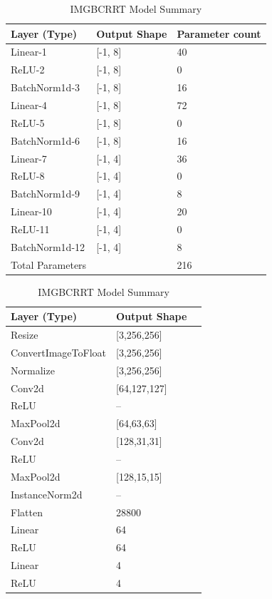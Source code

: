 \documentclass{article}
\begin{document}
\begin{table}[h]
\parbox{.45\linewidth}{
  \caption{BCRRT Model Summary}
  \label{bcrrt model summary}
  \centering
  \begin{tabular}{lll}
    \cmidrule(r){1-3}
   Layer (Type)          & Output Shape       &Parameter count\\
    \midrule
    Linear-1 & [-1, 8] & 40\\
    ReLU-2 & [-1, 8] & 0\\
    BatchNorm1d-3 & [-1, 8] & 16\\
    Linear-4 & [-1, 8] & 72\\
    ReLU-5 & [-1, 8] & 0\\
    BatchNorm1d-6 & [-1, 8] & 16\\
    Linear-7 & [-1, 4] & 36\\
    ReLU-8 & [-1, 4] & 0\\
    BatchNorm1d-9 & [-1, 4] & 8\\
    Linear-10 & [-1, 4] & 20\\
    ReLU-11 & [-1, 4] & 0\\
    BatchNorm1d-12 & [-1, 4] & 8\\
    \bottomrule
    \cmidrule(r){1-2}
        Total Parameters & & 216\\
    \bottomrule
  \end{tabular}}
  \hfill
\parbox{.45\linewidth}{
\caption{IMGBCRRT Model Summary}
	\label{imgbcrrt model summary}
	\centering
	\begin{tabular}{lll}
		\cmidrule(r){1-2}
		Layer (Type) & Output Shape\\
		\midrule
		Resize & [3,256,256]\\
		ConvertImageToFloat & [3,256,256]\\
		Normalize & [3,256,256]\\
		\midrule
		Conv2d & [64,127,127]\\
		ReLU & --\\
		MaxPool2d & [64,63,63]\\
		Conv2d & [128,31,31]\\
		ReLU & --\\
		MaxPool2d & [128,15,15]\\
		InstanceNorm2d & --\\
		\midrule
		Flatten & 28800\\
		Linear & 64\\
		ReLU & 64\\
		Linear & 4\\
		ReLU & 4\\
		\bottomrule
	\end{tabular}
	}
\end{table}
\end{document}
